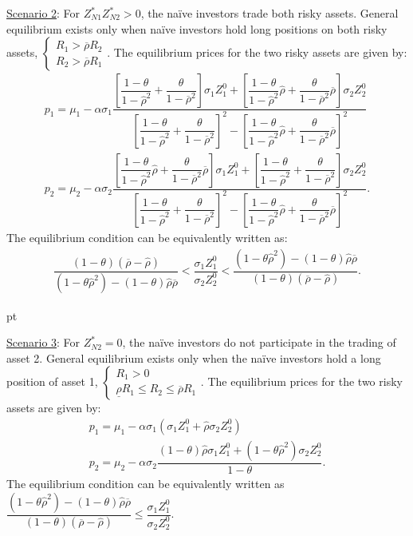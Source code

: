 \documentclass[10pt]{article}
\begin{document}
\underline{Scenario 2}: For $ Z_{N 1}^* Z_{N 2}^* > 0 $, the na\"ive investors trade both risky assets. General equilibrium exists only when na\"ive investors hold long positions on both risky assets, $ \left\{ \begin{matrix} R_1 > \overline{\rho} R_2 \\ R_2 > \overline{\rho} R_1 \end{matrix} \right. $. The equilibrium prices for the two risky assets are given by:
\begin{eqnarray}
& p_1 = \mu_1 - \alpha \sigma_1 \dfrac{\left[ \dfrac{1 - \theta}{1 - {\hat \rho}^2} + \dfrac{\theta}{1 - \overline{\rho}^2} \right] \sigma_1 Z_1^0 + \left[ \dfrac{1 - \theta}{1 - {\hat \rho}^2} {\hat \rho} + \dfrac{\theta}{1 - \overline{\rho}^2} \overline{\rho} \right] \sigma_2 Z_2^0}{\left[ \dfrac{1 - \theta}{1 - {\hat \rho}^2} + \dfrac{\theta}{1 - \overline{\rho}^2} \right]^2 - \left[ \dfrac{1 - \theta}{1 - {\hat \rho}^2} {\hat \rho} + \dfrac{\theta}{1 - \overline{\rho}^2} \overline{\rho} \right]^2} & \\
& p_2 = \mu_2 - \alpha \sigma_2 \dfrac{\left[ \dfrac{1 - \theta}{1 - {\hat \rho}^2} {\hat \rho} + \dfrac{\theta}{1 - \overline{\rho}^2} \overline{\rho} \right] \sigma_1 Z_1^0 + \left[ \dfrac{1 - \theta}{1 - {\hat \rho}^2} + \dfrac{\theta}{1 - \overline{\rho}^2} \right] \sigma_2 Z_2^0}{\left[ \dfrac{1 - \theta}{1 - {\hat \rho}^2} + \dfrac{\theta}{1 - \overline{\rho}^2} \right]^2 - \left[ \dfrac{1 - \theta}{1 - {\hat \rho}^2} {\hat \rho} + \dfrac{\theta}{1 - \overline{\rho}^2} \overline{\rho} \right]^2}. &
\end{eqnarray}
The equilibrium condition can be equivalently written as:
\begin{eqnarray*}
\dfrac{(1 - \theta) (\overline{\rho} - {\hat \rho})}{(1 - \theta {\hat \rho}^2) - (1 - \theta) {\hat \rho} \overline{\rho}} < \dfrac{\sigma_1 Z_1^0}{\sigma_2 Z_2^0} < \dfrac{(1 - \theta {\hat \rho}^2) - (1 - \theta) {\hat \rho} \overline{\rho}}{(1 - \theta) (\overline{\rho} - {\hat \rho})}.
\end{eqnarray*}

 pt

\underline{Scenario 3}: For $ Z_{N 2}^* = 0 $, the na\"ive investors do not participate in the trading of asset 2. General equilibrium exists only when the na\"ive investors hold a long position of asset 1, $ \left\{ \begin{matrix} R_1 > 0 \\ \underline{\rho} R_1 \leqslant R_2 \leqslant \overline{\rho} R_1 \end{matrix} \right. $. The equilibrium prices for the two risky assets are given by:
\begin{eqnarray}
& p_1 = \mu_1 - \alpha \sigma_1 (\sigma_1 Z_1^0 + {\hat \rho} \sigma_2 Z_2^0) & \\
& p_2 = \mu_2 - \alpha \sigma_2 \dfrac{(1 - \theta) {\hat \rho} \sigma_1 Z_1^0 + (1 - \theta {\hat \rho}^2) \sigma_2 Z_2^0}{1 - \theta}. &
\end{eqnarray}
The equilibrium condition can be equivalently written as $ \dfrac{(1 - \theta {\hat \rho}^2) - (1 - \theta) {\hat \rho} \overline{\rho}}{(1 - \theta) (\overline{\rho} - {\hat \rho})} \leqslant \dfrac{\sigma_1 Z_1^0}{\sigma_2 Z_2^0} $.
\end{document}
